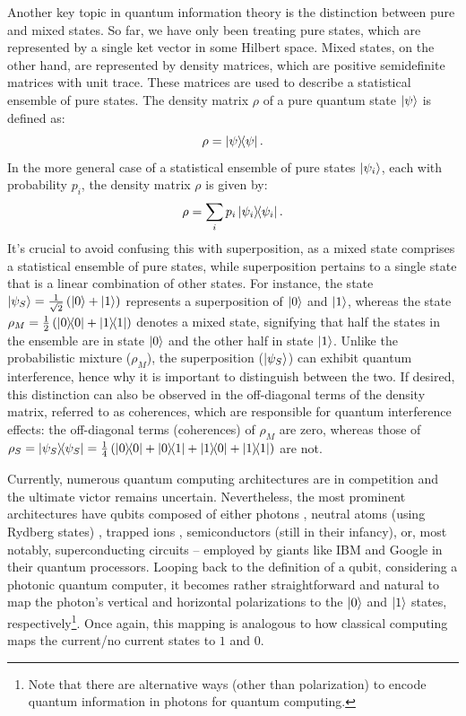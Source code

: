 Another key topic in quantum information theory is the distinction between pure and mixed states. So far, we have only been treating pure states, which are represented by a single ket vector in some Hilbert space. Mixed states, on the other hand, are represented by density matrices, which are positive semidefinite matrices with unit trace. These matrices are used to describe a statistical ensemble of pure states. The density matrix $\rho$ of a pure quantum state $\ket{\psi}$ is defined as:
\begin{equation}
  \rho = \dyad{\psi}{\psi}.
\end{equation}
In the more general case of a statistical ensemble of pure states $\ket{\psi_i}$, each with probability $p_i$, the density matrix $\rho$ is given by:
\begin{equation}
  \rho = \sum_i p_i \dyad{\psi_i}{\psi_i}.
\end{equation}
It's crucial to avoid confusing this with superposition, as a mixed state comprises a statistical ensemble of pure states, while superposition pertains to a single state that is a linear combination of other states. For instance, the state $\ket{\psi_S} = \frac{1}{\sqrt{2}}\left(\ket{0} + \ket{1}\right)$ represents a superposition of $\ket{0}$ and $\ket{1}$, whereas the state $\rho_M = \frac{1}{2}\left(\dyad{0}{0} + \dyad{1}{1}\right)$ denotes a mixed state, signifying that half the states in the ensemble are in state $\ket{0}$ and the other half in state $\ket{1}$. Unlike the probabilistic mixture ($\rho_M$), the superposition ($\ket{\psi_S}$) can exhibit quantum interference, hence why it is important to distinguish between the two. If desired, this distinction can also be observed in the off-diagonal terms of the density matrix, referred to as coherences, which are responsible for quantum interference effects: the off-diagonal terms (coherences) of $\rho_{M}$ are zero, whereas those of $\rho_{S} = \dyad{\psi_S}{\psi_S} = \frac{1}{4}\left(\dyad{0}{0} + \dyad{0}{1} + \dyad{1}{0} + \dyad{1}{1}\right)$ are not.

Currently, numerous quantum computing architectures are in competition and the ultimate victor remains uncertain. Nevertheless, the most prominent architectures have qubits composed of either photons \cite{slussarenko2019photonic, Xanadu_Photonics}, neutral atoms (using Rydberg states) \cite{Henriet2020quantumcomputing, Wu_2021}, trapped ions \cite{bruzewicz2019trapped}, semiconductors (still in their infancy), or, most notably, superconducting circuits \cite{Huang_2020, SC_Qubits} – employed by giants like IBM and Google in their quantum processors. Looping back to the definition of a qubit, considering a photonic quantum computer, it becomes rather straightforward and natural to map the photon's vertical and horizontal polarizations to the $\ket{0}$ and $\ket{1}$ states, respectively\footnote{Note that there are alternative ways (other than polarization) to encode quantum information in photons for quantum computing.}. Once again, this mapping is analogous to how classical computing maps the current/no current states to $1$ and $0$.


